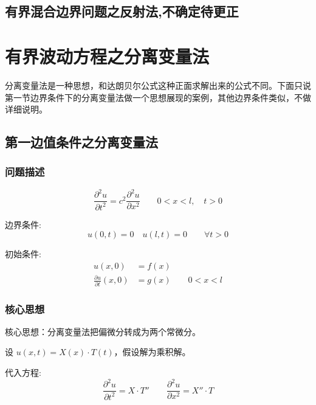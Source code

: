 \documentclass[12pt,a4paper]{article}
\numberwithin{subsection}{section}   %
\numberwithin{subsubsection}{subsection}
\theoremstyle{plain}
\theoremstyle{definition}
\theoremstyle{remark}
\theoremstyle{remark}
\begin{document}
	\subsection{有界混合边界问题之反射法,不确定待更正}

	
	
	
	\section{有界波动方程之分离变量法}
	分离变量法是一种思想，和达朗贝尔公式这种正面求解出来的公式不同。下面只说第一节边界条件下的分离变量法做一个思想展现的案例，其他边界条件类似，不做详细说明。
	\subsection{第一边值条件之分离变量法}
	\subsubsection{问题描述}
	\begin{equation} \label{eq:wave_equation}
		\frac{\partial^2 u}{\partial t^2} = c^2 \frac{\partial^2 u}{\partial x^2} \qquad 0 < x < l, \quad t > 0
	\end{equation}
	
	边界条件:
	\begin{equation} \label{eq:boundary_conditions}
		u(0, t) = 0 \quad u(l, t) = 0 \qquad \forall t > 0
	\end{equation}
	
	初始条件:
	\begin{equation} \label{eq:initial_conditions}
		\begin{aligned}
			u(x, 0) &= f(x) \\
			\frac{\partial u}{\partial t}(x, 0) &= g(x) \qquad 0 < x < l
		\end{aligned}
	\end{equation}
	
	\subsubsection{核心思想}
	核心思想：分离变量法把偏微分转成为两个常微分。
	
	设 \(u(x, t) = X(x) \cdot T(t)\)，假设解为乘积解。
	
	代入方程:
	\begin{equation} \label{eq:substitution}
		\frac{\partial^2 u}{\partial t^2} = X \cdot T'' \qquad \frac{\partial^2 u}{\partial x^2} = X'' \cdot T
	\end{equation}
	
\end{document}
